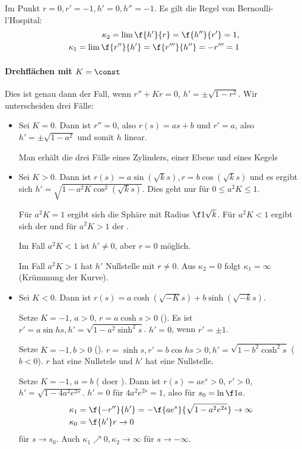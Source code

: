 Im Punkt $r = 0, r' = -1, h' = 0, h'' = -1$.
Es gilt die Regel von Bernoulli-l'Hospital:
\begin{align*}
	\kappa_2 = \lim \f{h'}{r} = \f{h''}{r'} = 1, \\
	\kappa_1 = \lim \f{r''}{h'} = \f{r'''}{h''} = -r''' = 1
\end{align*}

\paragraph{Drehflächen mit $K = \const$}

Dies ist genau dann der Fall, wenn $r'' + Kr = 0$, $h' = \pm \sqrt{1 - r^2}$.
Wir unterscheiden drei Fälle:
\begin{itemize}
	\item
		Sei $K = 0$.
		Dann ist $r'' = 0$, also $r(s) = as + b$ und $r' = a$, also $h' = \pm \sqrt{1 - a^2}$ und somit $h$ linear.

		Man erhält die drei Fälle eines Zylinders, einer Ebene und eines Kegels
	\item
		Sei $K > 0$.
		Dann ist $r(s) = a \sin(\sqrt k s), r = b\cos (\sqrt k s)$ und es ergibt sich $h' = \sqrt{1 - a^2 K \cos^2(\sqrt k s)}$.
		Dies geht nur für $0 \le a^2 K \le 1$.

		Für $a^2 K = 1$ ergibt sich die Sphäre mit Radius $\f 1{\sqrt k}$.
		Für $a^2 K < 1$ ergibt sich der  und für $a^2 K > 1$ der .

		Im Fall $a^2 K < 1$ ist $h' \neq 0$, aber $r = 0$ möglich.

		Im Fall $a^2 K > 1$ hat $h'$ Nullstelle mit $r \neq 0$.
		Aus $\kappa_2 = 0$ folgt $\kappa_1 = \infty$ (Krümmung der Kurve).
	\item
		Sei $K < 0$.
		Dann ist $r(s) = a\cosh (\sqrt{-K} s) + b \sinh (\sqrt{-k} s)$.

		Setze $K = -1$, $a > 0$, $r = a \cosh s > 0$ ().
		Es ist $r' = a \sin h s, h' = \sqrt{1 - a^2 \sinh^2 s}$.
		$h' = 0$, wenn $r' = \pm 1$.

		Setze $K = - 1, b > 0$ ().
		$r = \sinh s, r' = b \cos h s > 0, h' = \sqrt{1 - b^2 \cosh^2 s}$ ($b < 0$).
		$r$ hat eine Nullstele und $h'$ hat eine Nullstelle.

		Setze $K = -1$, $a = b$ ( doer ).
		Dann ist $r(s) = a e^s > 0$, $r' > 0$, $h' = \sqrt{1 - 4a^2 e^{2s}}$.
		$h' = 0$ für $4a^2 e^{2s} = 1$, also für $s_0 = \ln \f 1{a}$.
		\begin{align*}
			\kappa_1 &= \f {-r''}{h'} = - \f {ae^s}{\sqrt{1-a^2e^{2s}}} \to \infty \\
			\kappa_0 &= \f {h'}r \to 0
		\end{align*}
		für $s \to s_0$.
		Auch $\kappa_1 \nearrow 0, \kappa_2 \to \infty$ für $s \to -\infty$.
\end{itemize}


